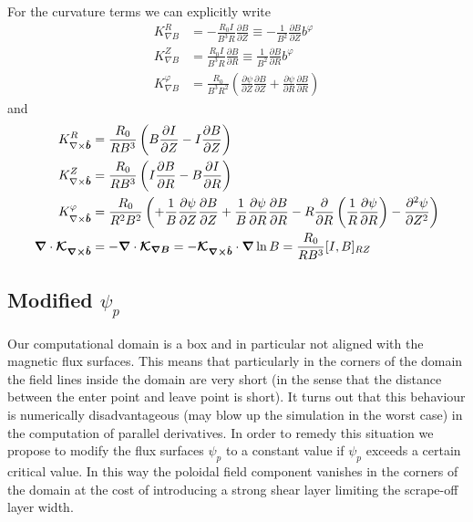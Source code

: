 For the curvature terms we can explicitly write
\begin{align}
K_{\nabla B}^R &= -\frac{R_0 I}{B^3R}\frac{\partial B}{\partial Z} \equiv -\frac{1}{B^2}\frac{\partial B}{\partial Z}b^\varphi \\
K_{\nabla B}^Z &= \frac{R_0 I}{B^3R}\frac{\partial B}{\partial R}\equiv \frac{1}{B^2}\frac{\partial B}{\partial R}b^\varphi \\
K_{\nabla B}^\varphi &= \frac{R_0}{B^3R^2}\left(
      \frac{\partial \psi}{\partial Z} \frac{\partial B}{\partial Z}
    + \frac{\partial \psi}{\partial R}\frac{\partial B}{\partial R}\right)
\label{}
\end{align}
and
\begin{align}
K_{\nabla\times\bm{\hat{b}}}^R &= \frac{R_0 }{RB^3}\left( B\frac{\partial I}{\partial Z} -I\frac{\partial B}{\partial Z}\right) \\
K_{\nabla\times\bm{\hat{b}}}^Z &= \frac{R_0 }{RB^3} \left( I\frac{\partial B}{\partial R} - B\frac{\partial I}{\partial R} \right)\\
K_{\nabla\times\bm{\hat{b}}}^\varphi &= \frac{R_0}{R^2B^2}\left(
+ \frac{1}{B}\frac{\partial\psi}{\partial Z} \frac{\partial B}{\partial Z}
+ \frac{1}{B}\frac{\partial \psi}{\partial R}\frac{\partial B}{\partial R}
-R\frac{\partial}{\partial R}\left(\frac{1}{R}\frac{\partial\psi}{\partial R}\right) 
- \frac{\partial^2 \psi}{\partial Z^2}
\right) \\
{\boldsymbol{\nabla}}\cdot{\boldsymbol{\mathcal K_{\nabla\times\bm{\hat{b}}}}} &= -{\boldsymbol{\nabla}}\cdot{\boldsymbol{\mathcal K_{\nabla B}}}=
    -{\boldsymbol{\mathcal K_{\nabla\times\bm{\hat{b}}}}}\cdot {\boldsymbol{\nabla}}\ln B = \frac{R_0}{RB^3}[I,B]_{RZ}
\label{}
\end{align}

\subsection{ Modified $\psi_p$}
Our computational domain is a box and in particular not aligned with the
magnetic flux surfaces. This means that particularly in the corners of
the domain the field lines inside the domain are very short (in the
sense that the distance between the enter point and leave point is short).
It turns out that this behaviour is numerically disadvantageous (may
blow up the simulation in the worst case) in the
computation of parallel derivatives. In order to remedy this situation
we propose to modify the flux surfaces $\psi_p$ to a constant value
if $\psi_p$ exceeds a certain critical value. In this way the poloidal
field component vanishes in the corners of the domain at the cost
of introducing a strong shear layer limiting the scrape-off layer width.

